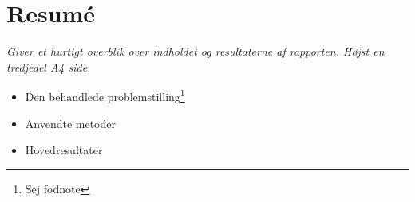 \section*{Resumé}
\textit{Giver et hurtigt overblik over indholdet og resultaterne af rapporten. Højst en tredjedel A4 side.}

\begin{itemize}
    \item Den behandlede problemstilling\footnote{Sej fodnote}
    \item Anvendte metoder
    \item Hovedresultater
\end{itemize}